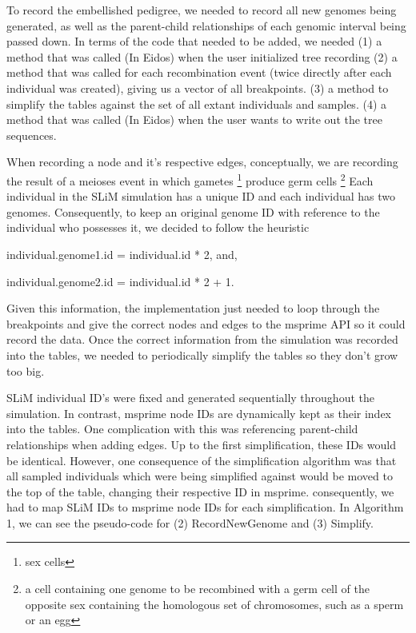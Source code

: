 \documentclass{article}
\begin{document}
To record the embellished pedigree, we needed to record all new genomes being generated, 
as well as the parent-child relationships of each genomic interval being passed down.
In terms of the code that needed to be added, we needed
(1) a method that was called (In Eidos) when the user initialized tree recording
(2) a method that was called for each recombination event (twice directly after each individual was created), giving us a vector of all breakpoints.
(3) a method to simplify the tables against the set of all extant individuals and samples.
(4) a method that was called (In Eidos) when the user wants to write out the tree sequences. \

When recording a node and it's respective edges, conceptually, we are recording the result of a meioses event in which 
gametes \footnote{sex cells} produce 
germ cells \footnote{a cell containing one genome to be recombined with a germ cell of the opposite sex containing the homologous set of chromosomes, such as a sperm or an egg}
Each individual in the SLiM simulation has a unique ID and each individual has two genomes.
Consequently, to keep an original genome ID with reference to the individual who possesses it,
we decided to follow the heuristic

\begin{center}
individual.genome1.id = individual.id * 2,
and,

individual.genome2.id = individual.id * 2 + 1.
\end{center}

Given this information, the implementation just needed to loop through the breakpoints 
and give the correct nodes and edges to the msprime API so it could record the data.
Once the correct information from the simulation was recorded into the tables, 
we needed to periodically simplify the tables so they don't grow too big. 

SLiM individual ID's were fixed and generated sequentially throughout the simulation.
In contrast, msprime node IDs are dynamically kept as their index into the tables.
One complication with this was referencing parent-child relationships when adding edges.
Up to the first simplification, these IDs would be identical.
However, one consequence of the simplification algorithm was that all sampled individuals which were being simplified against
would be moved to the top of the table, changing their respective ID in msprime. 
consequently, we had to map SLiM IDs to msprime node IDs for each simplification.
In Algorithm 1, we can see the pseudo-code for (2) RecordNewGenome and (3) Simplify. 
\end{document}

